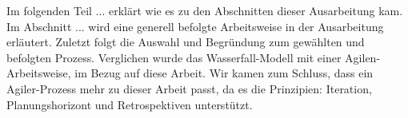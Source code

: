 
Im folgenden Teil ... erklärt wie es zu den Abschnitten dieser Ausarbeitung kam.
Im Abschnitt ... wird eine generell befolgte Arbeitsweise in der Ausarbeitung erläutert.
Zuletzt folgt die Auswahl und Begründung zum gewählten und befolgten Prozess. 
Verglichen wurde das Wasserfall-Modell mit einer Agilen-Arbeitsweise, im Bezug auf diese Arbeit. Wir kamen zum Schluss, dass ein Agiler-Prozess mehr zu dieser Arbeit passt, da es die Prinzipien: Iteration, Planungshorizont und Retrospektiven unterstützt.